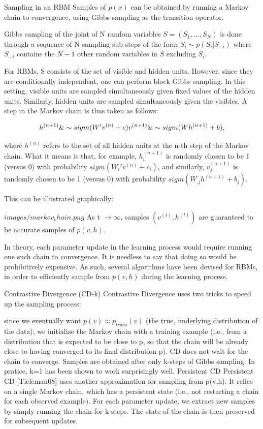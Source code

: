 \documentclass[12pt]{article}
\begin{document}
Sampling in an RBM
Samples of $p(x)$ can be obtained by running a Markov chain to convergence, using Gibbs sampling as the transition operator.

Gibbs sampling of the joint of N random variables $S=(S_1, ... , S_N)$ is done through a sequence of N sampling sub-steps of the form $S_i \sim p(S_i | S_{-i})$ where $S_{-i}$ contains the $N-1$ other random variables in $S$ excluding $S_i$.

For RBMs, S consists of the set of visible and hidden units. However, since they are conditionally independent, one can perform block Gibbs sampling. In this setting, visible units are sampled simultaneously given fixed values of the hidden units. Similarly, hidden units are sampled simultaneously given the visibles. A step in the Markov chain is thus taken as follows:

\begin{equation}
h^{(n+1)} \&\sim sigm(W'v^{(n)} + c) \\
v^{(n+1)} \&\sim sigm(W h^{(n+1)} + b),
\end{equation}

where $h^{(n)}$ refers to the set of all hidden units at the n-th step of the Markov chain. What it means is that, for example, $h^{(n+1)}_i$ is randomly chosen to be 1 (versus 0) with probability $sigm(W_i'v^{(n)} + c_i)$, and similarly, $v^{(n+1)}_j$ is randomly chosen to be 1 (versus 0) with probability $sigm(W_{.j} h^{(n+1)} + b_j)$.

This can be illustrated graphically:

$images/markov_chain.png$
As t $\rightarrow \infty$, samples $(v^{(t)}, h^{(t)})$ are guaranteed to be accurate samples of $p(v,h)$.

In theory, each parameter update in the learning process would require running one such chain to convergence. It is needless to say that doing so would be prohibitively expensive. As such, several algorithms have been devised for RBMs, in order to efficiently sample from $p(v,h)$ during the learning process.

Contrastive Divergence (CD-k)
Contrastive Divergence uses two tricks to speed up the sampling process:

since we eventually want $p(v) \approx p_{train}(v)$ (the true, underlying distribution of the data), we initialize the Markov chain with a training example (i.e., from a distribution that is expected to be close to p, so that the chain will be already close to having converged to its final distribution p).
CD does not wait for the chain to converge. Samples are obtained after only k-steps of Gibbs sampling. In pratice, k=1 has been shown to work surprisingly well.
Persistent CD
Persistent CD [Tieleman08] uses another approximation for sampling from p(v,h). It relies on a single Markov chain, which has a persistent state (i.e., not restarting a chain for each observed example). For each parameter update, we extract new samples by simply running the chain for k-steps. The state of the chain is then preserved for subsequent updates.
\end{document}
